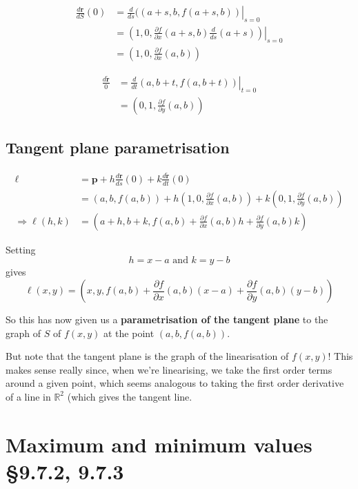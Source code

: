 \documentclass[11pt]{article}
\newcommand{\reals}{\mathbb{R}}
\renewcommand{\vec}[1]{\mathbf{#1}}
\begin{document}
\begin{align*}
\frac{d\vec{r}}{dS}(0) &= \left. \frac{d}{ds} ((a+s, b, f(a+s, b)) \right|_{s=0} \\
&= \left. \left( 1, 0, \frac{\partial f}{\partial x}(a+s, b) \frac{d}{ds}(a+s) \right) \right|_{s=0} \\
&= \left( 1, 0, \frac{\partial f}{\partial x}(a, b) \right)
\end{align*}

\begin{align*}
\frac{d\vec{\tilde{r}}}{0} &= \left. \frac{d}{dt}(a, b+t, f(a, b+t)) \right|_{t=0} \\
&= \left( 0, 1, \frac{\partial f}{\partial y}(a, b) \right)
\end{align*}

\subsection{Tangent plane parametrisation}
\begin{align*}
\vec{\ell} &= \vec{p} + h \frac{d \vec{r}}{ds}(0) + k \frac{d\vec{\tilde{r}}}{dt}(0) \\
&= (a, b, f(a, b)) + h \left( 1, 0, \frac{\partial f}{\partial x}(a, b) \right) + k \left( 0, 1, \frac{\partial f}{\partial y}(a, b) \right) \\
\Rightarrow \ell(h, k) &= \left(a+h, b + k, f(a, b) + \frac{\partial f}{\partial x}(a, b) h + \frac{\partial f}{\partial y}(a, b) k \right)
\end{align*}

Setting
\[ h = x-a \text{ and } k = y-b \]
gives
\[ \ell(x, y) = \left(x, y, f(a, b) + \frac{\partial f}{\partial x}(a, b) (x-a) + \frac{\partial f}{\partial y}(a, b) (y-b) \right) \]

So this has now given us a \textbf{parametrisation of the tangent plane} to the graph of $S$ of $f(x,y)$ at the point $(a, b, f(a,b))$.

But note that the tangent plane is the graph of the linearisation of $f(x,y)$! This makes sense really since, when we're linearising, we take the first order terms around a given point, which seems analogous to taking the first order derivative of a line in $\reals^2$ (which gives the tangent line.

\section{Maximum and minimum values §9.7.2, 9.7.3}
\end{document}
